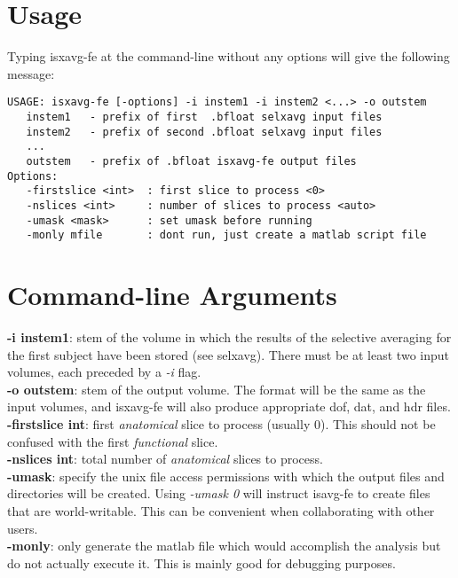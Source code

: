 \documentclass[10pt]{article}
\begin{document}
\section{Usage}
Typing isxavg-fe at the command-line without any options will give the
following message:\\ 

\begin{small}
\begin{verbatim}
USAGE: isxavg-fe [-options] -i instem1 -i instem2 <...> -o outstem
   instem1   - prefix of first  .bfloat selxavg input files
   instem2   - prefix of second .bfloat selxavg input files
   ... 
   outstem   - prefix of .bfloat isxavg-fe output files
Options:
   -firstslice <int>  : first slice to process <0>
   -nslices <int>     : number of slices to process <auto>
   -umask <mask>      : set umask before running
   -monly mfile       : dont run, just create a matlab script file
\end{verbatim}
\end{small}

\section{Command-line Arguments}

\noindent
{\bf -i instem1}: stem of the volume in which the results of the
selective averaging for the first subject have been stored (see
selxavg).  There must be at least two input volumes, each preceded by
a {\em -i} flag.\\

\noindent
{\bf -o outstem}: stem of the output volume.  The format will be the
same as the input volumes, and isxavg-fe will also produce appropriate
dof, dat, and hdr files.\\

\noindent
{\bf -firstslice int}: first {\em anatomical} slice to process (usually 0).
This should not be confused with the first {\em functional} slice.\\

\noindent
{\bf -nslices int}: total number of {\em anatomical} slices to process.\\

\noindent
{\bf -umask}: specify the unix file access permissions with which the
output files and directories will be created.  Using {\em -umask 0}
will instruct isavg-fe to create files that are world-writable.  This
can be convenient when collaborating with other users.\\

\noindent
{\bf -monly}: only generate the matlab file which would accomplish the
analysis but do not actually execute it.  This is mainly good for
debugging purposes.\\
\end{document}

